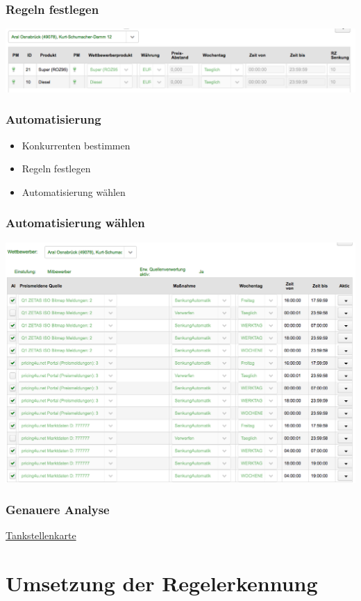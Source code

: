 \documentclass[hyperref={pdfpagelabels=false}]{beamer}
\begin{document}
\begin{frame}
\frametitle{Regeln festlegen}
\begin{center}
\includegraphics[scale=0.30]{regeln1.png}
\end{center}
\end{frame}

\begin{frame}
\frametitle{Automatisierung}
\begin{itemize}
\item Konkurrenten bestimmen
\item Regeln festlegen
\item Automatisierung wählen
\end{itemize}
\end{frame}

\begin{frame}
\frametitle{Automatisierung wählen}
\begin{center}
\includegraphics[scale=0.2]{automatik.png}
\end{center}
\end{frame}

\begin{frame}
\frametitle{Genauere Analyse} 
\href{http://10.1.0.1:8091/client/}{Tankstellenkarte}
\end{frame}

\section{Umsetzung der Regelerkennung}
\end{document}

